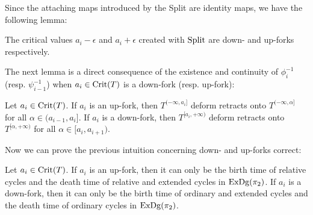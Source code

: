 Since the attaching maps introduced by the Split are
identity maps, we have the following lemma:
\begin{lem}\label{lem:classif}
The critical values $a_i-\epsilon$ and $a_i+\epsilon$ created with $\mathrm{Split}$ are down- and up-forks respectively.
\end{lem}

The next lemma is a direct consequence of the existence and continuity
of $\phi_i^{-1}$ (resp. $\psi_{i-1}^{-1}$) when $a_i\in\mathrm{Crit}(T)$ is a
down-fork (resp. up-fork):

\begin{lem}\label{lem:forks} Let $a_i\in\mathrm{Crit}(T)$. If $a_i$ is an up-fork, then
    $T^{(-\infty,a_i]}$ deform retracts onto
    $T^{(-\infty,\alpha]}$ for all $\alpha \in
  (a_{i-1},a_i]$. %
    If $a_i$ is a down-fork, then
    $T^{[a_i,+\infty)}$ deform retracts onto
      $T^{[\alpha,+\infty)}$ for all $\alpha \in [a_i,a_{i+1})$.
\end{lem}

Now we can prove the previous intuition concerning down- and up-forks correct:

\begin{lem}\label{lem:dict}
Let $a_i\in\mathrm{Crit}(T)$.
If $a_i$ is an up-fork, then it can only be the birth time of relative cycles and the death time of relative and extended cycles in $\mathrm{ExDg}(\pi_2)$.
If $a_i$ is a down-fork, then it can only be the birth time of ordinary and extended cycles and the death time of ordinary cycles in $\mathrm{ExDg}(\pi_2)$.
\end{lem}

